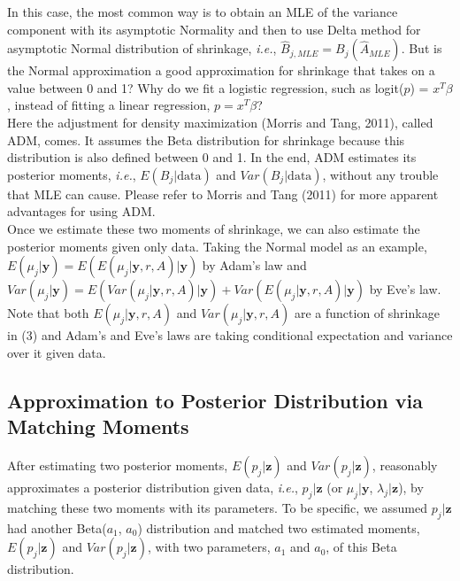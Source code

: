 \documentclass[article]{jss}
\begin{document}
In this case, the most common way is to obtain an MLE of the variance component with its asymptotic Normality and then to use Delta method for asymptotic Normal distribution of shrinkage, \emph{i.e.}, $\hat{B}_{j, MLE}=B_{j}(\hat{A}_{MLE})$. But is the Normal approximation a good approximation for shrinkage that takes on a value between 0 and 1? Why do we fit a logistic regression, such as logit($p$) = $x^{T}\beta$, instead of fitting a linear regression, $p = x^{T}\beta$?
\\

Here the adjustment for density maximization (Morris and Tang, 2011), called ADM, comes. It assumes the Beta distribution for shrinkage because this distribution is also defined between 0 and 1. In the end, ADM  estimates its posterior moments, \emph{i.e.}, $E(B_{j}\vert\textrm{data})$ and $Var(B_{j}\vert\textrm{data})$, without any trouble that MLE can cause. Please refer to Morris and Tang (2011) for more apparent advantages for using ADM.
\\

Once we estimate these two moments of shrinkage, we can also estimate the posterior moments given only data. Taking the Normal model as an example,  $E(\mu_{j}\vert \textbf{y})=E(E(\mu_{j}\vert \textbf{y}, r, A)\vert \textbf{y})$ by Adam's law and $Var(\mu_{j}\vert \textbf{y})=E(Var(\mu_{j}\vert \textbf{y}, r, A)\vert \textbf{y})+Var(E(\mu_{j}\vert \textbf{y}, r, A)\vert \textbf{y})$ by Eve's law. Note that both $E(\mu_{j}\vert \textbf{y}, r, A)$ and $Var(\mu_{j}\vert \textbf{y}, r, A)$ are a function of shrinkage in (3) and Adam's and Eve's laws are taking conditional expectation and variance over it given data.

\subsection[Approximation to Posterior Distribution by Moment Matching]{Approximation to Posterior Distribution via Matching Moments}
After estimating two posterior moments, $E(p_{j}\vert \textbf{z})$ and $Var(p_{j}\vert \textbf{z})$,  reasonably approximates a posterior distribution given data, \emph{i.e.}, $p_{j}\vert \textbf{z}$ (or $\mu_{j}\vert \textbf{y}$, $\lambda_{j}\vert \textbf{z}$), by matching these two moments with its parameters. To be specific, we assumed $p_{j}\vert \textbf{z}$ had another Beta($a_{1}$, $a_{0}$) distribution and matched two estimated moments, $E(p_{j}\vert \textbf{z})$ and $Var(p_{j}\vert \textbf{z})$, with two parameters, $a_{1}$ and $a_{0}$, of this Beta distribution. 
\end{document}
